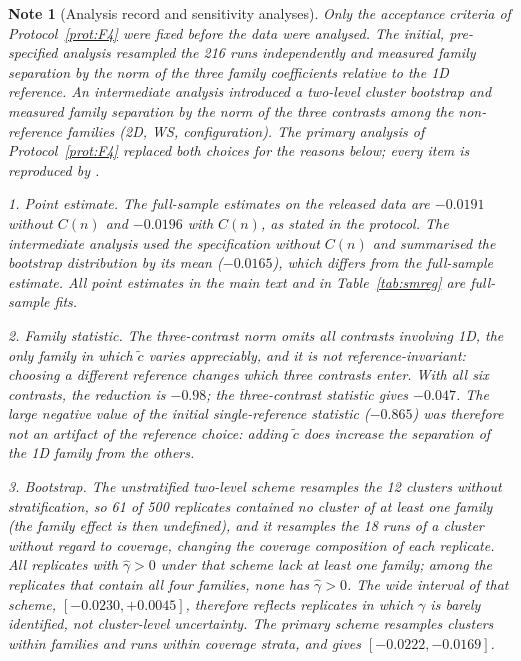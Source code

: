 \documentclass[pdflatex,sn-mathphys-num]{sn-jnl}
\newcommand{\GamPt}{-0.0196}
\newcommand{\GamLo}{-0.0222}
\newcommand{\GamHi}{-0.0169}
\newcommand{\RedPt}{-0.98}
\newcommand{\RedThreePt}{-0.047}
\newcommand{\OrigGamMean}{-0.0165}
\newcommand{\OrigMissing}{61}
\newcommand{\NoNPt}{-0.0191}
\theoremstyle{thmstyleone}%
\theoremstyle{thmstylethree}%
\newtheorem{note}[theorem]{Note}
\theoremstyle{thmstyletwo}%
\newcommand{\ctil}{\tilde{c}}
\begin{document}
\begin{note}[Analysis record and sensitivity analyses]
\label{sec:F5}
Only the acceptance criteria of Protocol~\ref{prot:F4} were fixed before
the data were analysed. The initial, pre-specified analysis resampled the
216 runs independently and measured family separation by the norm of the
three family coefficients relative to the 1D reference. An intermediate
analysis introduced a two-level cluster bootstrap and measured family
separation by the norm of the three contrasts among the non-reference
families (2D, WS, configuration). The primary analysis of
Protocol~\ref{prot:F4} replaced both choices for the reasons below; every
item is reproduced by .

\emph{1. Point estimate.} The full-sample estimates on the released data
are $\NoNPt$ without $C(n)$ and $\GamPt$ with $C(n)$, as stated in the
protocol. The intermediate analysis used the specification without $C(n)$
and summarised the bootstrap distribution by its mean ($\OrigGamMean$),
which differs from the full-sample estimate. All point estimates in the
main text and in Table~\ref{tab:smreg} are full-sample fits.

\emph{2. Family statistic.} The three-contrast norm omits all contrasts
involving 1D, the only family in which $\ctil$ varies appreciably, and it
is not reference-invariant: choosing a different reference changes which
three contrasts enter. With all six contrasts, the reduction is $\RedPt$;
the three-contrast statistic gives $\RedThreePt$. The large negative value
of the initial single-reference statistic ($-0.865$) was therefore not an
artifact of the reference choice: adding $\ctil$ does increase the
separation of the 1D family from the others.

\emph{3. Bootstrap.} The unstratified two-level scheme resamples the 12
clusters without stratification, so \OrigMissing{} of 500 replicates
contained no cluster of at least one family (the family effect is then
undefined), and it resamples the 18 runs of a cluster without regard to
coverage, changing the coverage composition of each replicate. All
replicates with $\hat\gamma>0$ under that scheme lack at least one family;
among the replicates that contain all four families, none has
$\hat\gamma>0$. The wide interval of that scheme, $[-0.0230,+0.0045]$,
therefore reflects replicates in which $\gamma$ is barely identified, not
cluster-level uncertainty. The primary scheme resamples clusters within
families and runs within coverage strata, and gives $[\GamLo,\GamHi]$.


\end{note}
\end{document}
